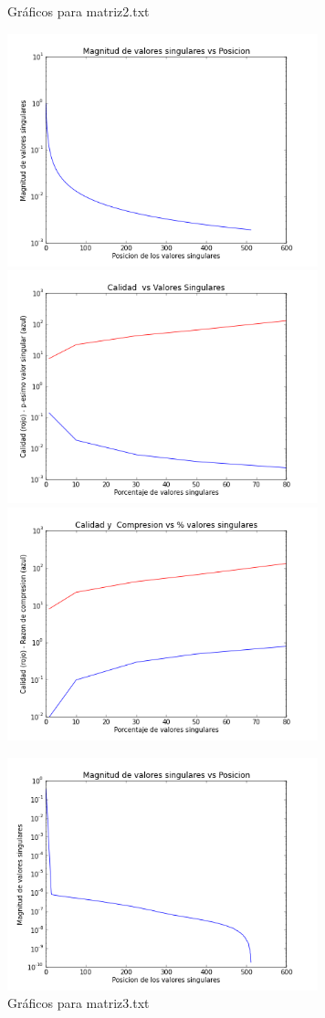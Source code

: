 \documentclass[spanish, fleqn]{article}
\begin{document}
	\begin{figure}[htbp]
		\begin{minipage}[b]{0.5\linewidth}
			\caption{Gráficos para matriz2.txt}
			\includegraphics[width=90mm]{./Graficos/matriz2-svalue}
			\includegraphics[width=90mm]{./Graficos/matriz2-quality}
			\includegraphics[width=90mm]{./Graficos/matriz2-size}
			\label{fig:figura5}
		\end{minipage}%
		\begin{minipage}[b]{0.5\linewidth}
			\caption{Gráficos para matriz3.txt}
			\includegraphics[width=90mm]{./Graficos/matriz3-svalue}

\end{minipage}
\end{figure}
\end{document}
